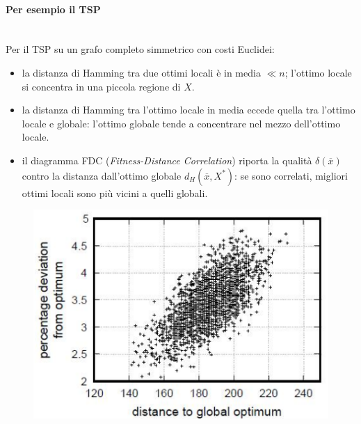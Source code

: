 \documentclass{article}
\begin{document}
\paragraph{Per esempio il TSP}\mbox{}\\
Per il TSP su un grafo completo simmetrico con costi Euclidei:
\begin{itemize}
    \item la distanza di Hamming tra due ottimi locali è in media $\ll n$; l'ottimo locale si concentra in una piccola regione di $X$.
    \item la distanza di Hamming tra l'ottimo locale in media eccede quella tra l'ottimo locale e globale: l'ottimo globale tende a concentrare nel
          mezzo dell'ottimo locale.
    \item il diagramma FDC (\textit{Fitness-Distance Correlation}) riporta la qualità $\delta(\overline{x})$ contro la distanza
          dall'ottimo globale $d_H(\overline{x},X^*)$: se sono correlati, migliori ottimi locali sono più vicini a quelli globali.
\end{itemize}
\begin{figure}[h]
    \centering
    \includegraphics[scale=0.5]{images/global_local_opt.png}
\end{figure}
\end{document}
